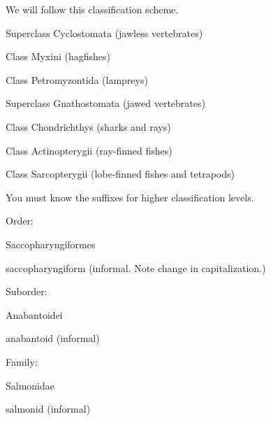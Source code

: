 \documentclass[t,handout]{beamer}  %
\begin{document}
\begin{frame}[t,plain]{We will follow this classification scheme.}

	\hspace{5em} Superclass Cyclostomata (jawless vertebrates)

	\hspace{6em} Class Myxini (hagfishes)

	\hspace{6em} Class Petromyzontida (lampreys)

	\hspace{5em} Superclass Gnathostomata (jawed vertebrates)

	\hspace{6em} Class Chondrichthys (sharks and rays)

	\hspace{6em} Class Actinopterygii (ray-finned fishes)

	\hspace{6em} Class Sarcopterygii (lobe-finned fishes and tetrapods)
	
\end{frame}

\begin{frame}[t,plain]{You must know the suffixes for higher classification levels.}

	\hangpara Order: 
	
	\hspace{2em} Saccopharyngiformes
	
	\hspace{2em} saccopharyngiform (informal. Note change in capitalization.)

	\hangpara Suborder: 
	
	\hspace{2em} Anabantoidei
	
	\hspace{2em} anabantoid (informal)
	
	\hangpara Family: 
	
	\hspace{2em} Salmonidae
	
	\hspace{2em} salmonid (informal)
	
\end{frame}
\end{document}
